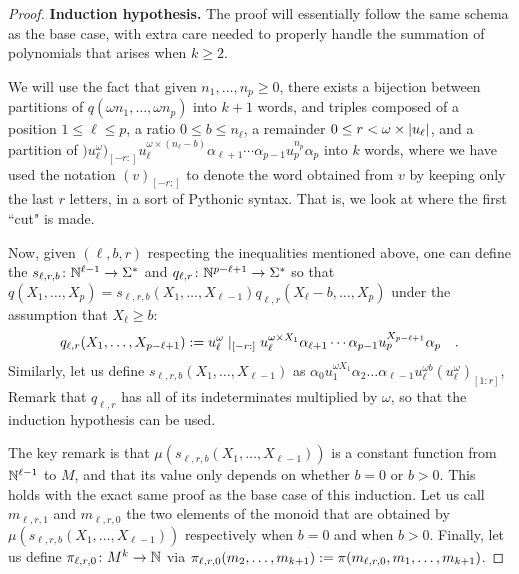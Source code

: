 \begin{proof}
	\textbf{Induction hypothesis.}
	The proof will essentially follow the same schema as the base case,
	with extra care needed to properly handle the summation of polynomials
	that arises when $k \geq 2$.

	We will use the fact that given $n_1, \dots, n_p \geq 0$,
	there exists a bijection between
	partitions of $q(\omega n_1, \dots, \omega n_p)$
	into $k+1$ words, and
	triples composed of
	a position  $1 \leq \ell \leq p$,
	a ratio     $0 \leq b \leq n_\ell$,
	a remainder $0 \leq r < \omega \times \card{u_\ell}$,
	and a partition of
	$)u_\ell^\omega)_{[-r:]} u_\ell^{\omega \times (n_\ell - b)}
		\alpha_{\ell+1} \cdots \alpha_{p-1} u_p^{n_p} \alpha_{p}$
	into $k$ words,
	where we have used the notation
	$(v)_{[-r:]}$ to denote the word obtained from $v$
	by keeping only the last $r$ letters, in a sort of Pythonic syntax.
	That is, we look at where the first ``cut" is made.

	Now, given $(\ell, b, r)$ respecting the inequalities
	mentioned above,
	one can define the 
	$s_{\ell,r,b} \colon \mathbb{N}^{\ell - 1} \to \Sigma^*$
	and
	$q_{\ell,r} \colon \mathbb{N}^{p - \ell + 1} \to \Sigma^*$
	so that
	$q(X_1, \dots, X_p) = s_{\ell,r,b}(X_1, \dots, X_{\ell-1})
		q_{\ell, r}(X_{\ell} - b, \dots, X_p)$
	under the assumption that $X_\ell \geq b$:
	\begin{equation*}
		q_{\ell,r}(X_{1}, \dots, X_{p - \ell + 1})
		\mathrel{:=}
		u_\ell^\omega\mid_{[-r:]} u_\ell^{\omega \times X_1}
		\alpha_{\ell+1} \cdots \alpha_{p-1} u_p^{X_{p - \ell + 1}} \alpha_{p}
		\quad .
	\end{equation*}
	Similarly, let us define
	$s_{\ell, r, b}(X_1, \dots, X_{\ell - 1})$
	as
	$\alpha_0 u_1^{\omega X_1} \alpha_2 \dots \alpha_{\ell - 1}
		u_\ell^{\omega b} (u_{\ell}^\omega)_{[1:r]}$,
	Remark that $q_{\ell,r}$ has all of its indeterminates
	multiplied by $\omega$, so that the induction hypothesis
	can be used.

	The key remark is that $\mu(s_{\ell,r,b}(X_1, \dots, X_{\ell - 1}))$ is a
	constant function from $\mathbb{N}^{\ell-1}$ to $M$, and that its value
	only depends on whether $b = 0$ or $b > 0$.
	This holds with
	the exact same proof as the base case of this induction. Let us call
	$m_{\ell,r,1}$ and $m_{\ell,r,0}$ the two elements of the monoid that are
	obtained by $\mu(s_{\ell,r,b}(X_1, \dots, X_{\ell-1}))$ respectively when
	$b = 0$ and when $b > 0$. Finally, let us define $\pi_{\ell,r,0} \colon M^k
		\to \mathbb{N}$ via $\pi_{\ell,r,0}(m_2, \dots, m_{k+1}) \mathrel{:=}
		\pi(m_{\ell,r,0}, m_1, \dots, m_{k+1})$.


\end{proof}
